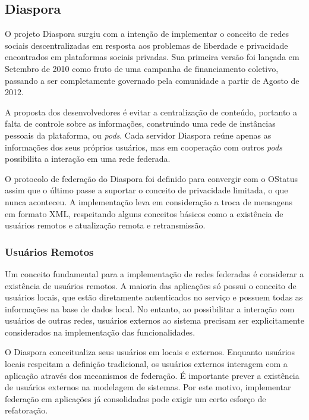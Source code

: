 \subsection{Diaspora}

O projeto Diaspora surgiu com a intenção de implementar o conceito de redes sociais
descentralizadas em resposta aos problemas de liberdade e privacidade encontrados em
plataformas sociais privadas. Sua primeira versão foi lançada em Setembro de 2010
como fruto de uma campanha de financiamento coletivo, passando a ser completamente
governado pela comunidade a partir de Agosto de 2012.

A proposta dos desenvolvedores é evitar a centralização de conteúdo, portanto a
falta de controle sobre as informações, construindo uma rede de instâncias pessoais
da plataforma, ou \textit{pods}. Cada servidor Diaspora reúne apenas as informações
dos seus próprios usuários, mas em cooperação com outros \textit{pods} possibilita a
interação em uma rede federada.

O protocolo de federação do Diaspora foi definido para convergir com o OStatus assim
que o último passe a suportar o conceito de privacidade limitada, o que nunca
aconteceu. A implementação leva em consideração a troca de mensagens em formato XML,
respeitando alguns conceitos básicos como a existência de usuários remotos e
atualização remota e retransmissão.

\subsubsection{Usuários Remotos}

Um conceito fundamental para a implementação de redes federadas é considerar a
existência de usuários remotos. A maioria das aplicações só possui o conceito de
usuários locais, que estão diretamente autenticados no serviço e possuem todas as
informações na base de dados local. No entanto, ao possibilitar a interação com
usuários de outras redes, usuários externos ao sistema precisam ser explicitamente
considerados na implementação das funcionalidades.

O Diaspora conceitualiza seus usuários em locais e externos. Enquanto usuários locais
respeitam a definição tradicional, os usuários externos interagem com a aplicação
através dos mecanismos de federação. É importante prever a existência de usuários
externos na modelagem de sistemas. Por este motivo, implementar federação em
aplicações já consolidadas pode exigir um certo esforço de refatoração. %


